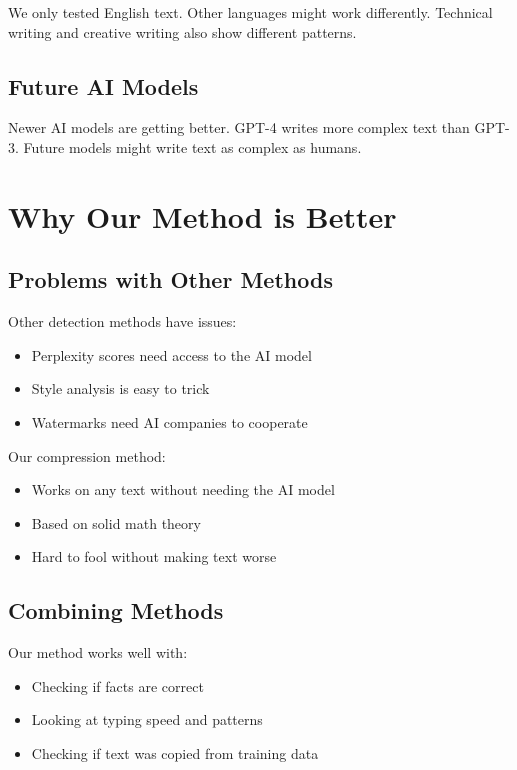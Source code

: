 \documentclass[12pt,a4paper]{report}
\begin{document}
We only tested English text. Other languages might work differently. Technical writing and creative writing also show different patterns.

\subsection{Future AI Models}

Newer AI models are getting better. GPT-4 writes more complex text than GPT-3. Future models might write text as complex as humans.

\section{Why Our Method is Better}

\subsection{Problems with Other Methods}

Other detection methods have issues:
\begin{itemize}
    \item Perplexity scores need access to the AI model
    \item Style analysis is easy to trick
    \item Watermarks need AI companies to cooperate
\end{itemize}

Our compression method:
\begin{itemize}
    \item Works on any text without needing the AI model
    \item Based on solid math theory
    \item Hard to fool without making text worse
\end{itemize}

\subsection{Combining Methods}

Our method works well with:
\begin{itemize}
    \item Checking if facts are correct
    \item Looking at typing speed and patterns
    \item Checking if text was copied from training data
\end{itemize}
\end{document}
